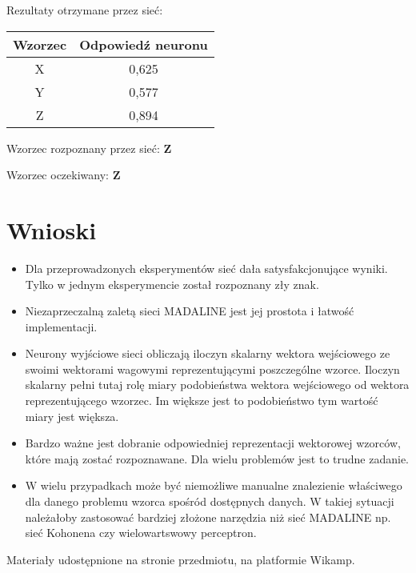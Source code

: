 \documentclass[12pt]{article}
\begin{document}
Rezultaty otrzymane przez sieć:

\begin{table}[h]
\begin{tabular}{|c|c|}
\hline 
Wzorzec & Odpowiedź neuronu \\ 
\hline 
X & 0,625 \\ \hline 
Y & 0,577 \\ \hline 
Z & 0,894 \\ \hline 
\end{tabular} 
\end{table}

Wzorzec rozpoznany przez sieć: \textbf{Z}

Wzorzec oczekiwany: \textbf{Z}

\section{Wnioski}

\begin{itemize}
\item Dla przeprowadzonych eksperymentów sieć dała satysfakcjonujące wyniki. Tylko w jednym eksperymencie został rozpoznany zły znak.
\item Niezaprzeczalną zaletą sieci MADALINE jest jej prostota i łatwość implementacji.
\item Neurony wyjściowe sieci obliczają iloczyn skalarny wektora wejściowego ze swoimi wektorami wagowymi reprezentującymi poszczególne wzorce. Iloczyn skalarny pełni tutaj rolę miary podobieństwa wektora wejściowego od wektora reprezentującego wzorzec. Im większe jest to podobieństwo tym wartość miary jest większa.
\item Bardzo ważne jest dobranie odpowiedniej reprezentacji wektorowej wzorców, które mają zostać rozpoznawane. Dla wielu problemów jest to trudne zadanie.
\item W wielu przypadkach może być niemożliwe manualne znalezienie właściwego dla danego problemu wzorca spośród dostępnych danych. W takiej sytuacji należałoby zastosować bardziej złożone narzędzia niż sieć MADALINE np. sieć Kohonena czy wielowartswowy perceptron. 
\end{itemize}

\begin{thebibliography}{0}

 Materiały udostępnione na stronie przedmiotu, na platformie Wikamp.

\end{thebibliography}
\end{document}
